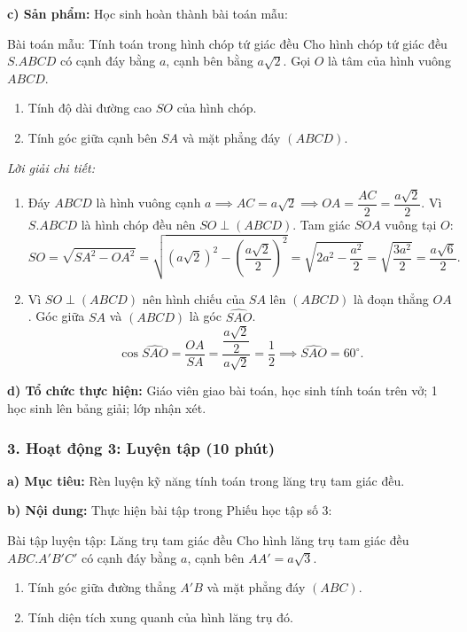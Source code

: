 \documentclass[12pt, a4paper]{article}
\begin{document}
\noindent \textbf{c) Sản phẩm:}
Học sinh hoàn thành bài toán mẫu:
\begin{pedabox}{Bài toán mẫu: Tính toán trong hình chóp tứ giác đều}
Cho hình chóp tứ giác đều $S.ABCD$ có cạnh đáy bằng $a$, cạnh bên bằng $a\sqrt{2}$. Gọi $O$ là tâm của hình vuông $ABCD$.
\begin{enumerate}[leftmargin=0.6cm]
    \item Tính độ dài đường cao $SO$ của hình chóp.
    \item Tính góc giữa cạnh bên $SA$ và mặt phẳng đáy $(ABCD)$.
\end{enumerate}
\end{pedabox}
\textit{Lời giải chi tiết:}
\begin{enumerate}[leftmargin=0.6cm]
    \item Đáy $ABCD$ là hình vuông cạnh $a \implies AC = a\sqrt{2} \implies OA = \dfrac{AC}{2} = \dfrac{a\sqrt{2}}{2}$.
    Vì $S.ABCD$ là hình chóp đều nên $SO \perp (ABCD)$.
    Tam giác $SOA$ vuông tại $O$:
    $$SO = \sqrt{SA^2 - OA^2} = \sqrt{(a\sqrt{2})^2 - \left(\dfrac{a\sqrt{2}}{2}\right)^2} = \sqrt{2a^2 - \dfrac{a^2}{2}} = \sqrt{\dfrac{3a^2}{2}} = \dfrac{a\sqrt{6}}{2}.$$
    \item Vì $SO \perp (ABCD)$ nên hình chiếu của $SA$ lên $(ABCD)$ là đoạn thẳng $OA$.
    Góc giữa $SA$ và $(ABCD)$ là góc $\widehat{SAO}$.
    $$\cos \widehat{SAO} = \dfrac{OA}{SA} = \dfrac{\dfrac{a\sqrt{2}}{2}}{a\sqrt{2}} = \dfrac{1}{2} \implies \widehat{SAO} = 60^\circ.$$
\end{enumerate}

\noindent \textbf{d) Tổ chức thực hiện:}
Giáo viên giao bài toán, học sinh tính toán trên vở; 1 học sinh lên bảng giải; lớp nhận xét.

\subsubsection*{3. Hoạt động 3: Luyện tập (10 phút)}

\noindent \textbf{a) Mục tiêu:}
Rèn luyện kỹ năng tính toán trong lăng trụ tam giác đều.

\noindent \textbf{b) Nội dung:}
Thực hiện bài tập trong Phiếu học tập số 3:
\begin{pedabox}{Bài tập luyện tập: Lăng trụ tam giác đều}
Cho hình lăng trụ tam giác đều $ABC.A'B'C'$ có cạnh đáy bằng $a$, cạnh bên $AA' = a\sqrt{3}$.
\begin{enumerate}[leftmargin=0.6cm]
    \item Tính góc giữa đường thẳng $A'B$ và mặt phẳng đáy $(ABC)$.
    \item Tính diện tích xung quanh của hình lăng trụ đó.
\end{enumerate}
\end{pedabox}
\end{document}
